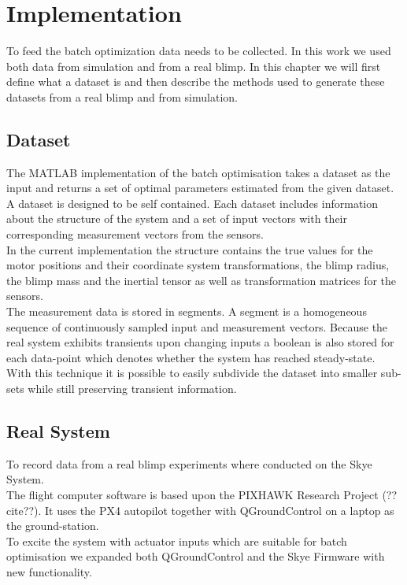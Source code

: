 \chapter{Implementation}
\label{chap:implementation}

To feed the batch optimization data needs to be collected.
In this work we used both data from simulation and from a real blimp.
In this chapter we will first define what a dataset is and then 
describe the methods used to generate these datasets from a real blimp and from simulation.

\section{Dataset}
\label{sec:dataset}
The MATLAB implementation of the batch optimisation takes a dataset as the input and returns a set of optimal parameters estimated from the given dataset. \\
A dataset is designed to be self contained. 
Each dataset includes information about the structure of the system and a set of input vectors with their corresponding measurement vectors from the sensors. \\
In the current implementation the structure contains the true values for the motor positions and their coordinate system transformations, the blimp radius, the blimp mass and the inertial tensor as well as transformation matrices for the sensors. \\
The measurement data is stored in segments.
A segment is a homogeneous sequence of continuously sampled input and measurement vectors.
Because the real system exhibits transients upon changing inputs a boolean is also stored for each data-point which denotes whether the system has reached steady-state. \\
With this technique it is possible to easily subdivide the dataset into smaller sub-sets while still preserving transient information.

\section{Real System}
\label{sec:real_system}
To record data from a real blimp experiments where conducted on the Skye System. \\
The flight computer software is based upon the PIXHAWK Research Project (??cite??). 
It uses the PX4 autopilot together with QGroundControl on a laptop as the ground-station. \\
To excite the system with actuator inputs which are suitable for batch optimisation we expanded both QGroundControl and the Skye Firmware with new functionality.

